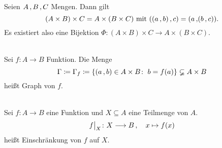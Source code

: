 \documentclass[../ana1.tex]{subfiles}
\begin{document}
\begin{bem}
	Seien \(A \operatorname{,} B \operatorname{,} C\) Mengen. Dann gilt
	\[(A \times B) \times C = A \times (B \times C) \text{ mit } ((a \operatorname{,} b) \operatorname{,} c) = (a \operatorname{,} (b \operatorname{,} c)).\]
	Es existiert also eine Bijektion \(\Phi \colon (A \times B) \times C \longrightarrow A \times (B \times C)\).
\end{bem}

\begin{defi}\leavevmode \\
	Sei \(f \colon A \longrightarrow B \) Funktion. Die Menge
	\[\Gamma \coloneqq \Gamma_f \coloneqq \{(a \operatorname{,} b) \in A \times B \colon \; b = f(a)\} \varsubsetneq A \times B \]
	heißt Graph von \(f\).
	\iftoggle{short}{}{
		\begin{figure}[h!]
			\centering
			\subfloat[Graph]{\subgraphic{0.3}{img05.pdf}}
			\qquad
			\subfloat[Kein Graph]{\subgraphic{0.3}{img06.pdf}}
		\end{figure}
	}
\end{defi}

\begin{notation}\leavevmode \\
	Sei \(f \colon A \longrightarrow B \) eine Funktion und \(X \subseteq A\) eine Teilmenge von \(A \).
	\[\restr{f}{X} \colon X \longrightarrow B \ko \quad x \mapsto f(x)\]
	heißt Einschränkung von \(f \) auf \(X \).
\end{notation}
\end{document}
